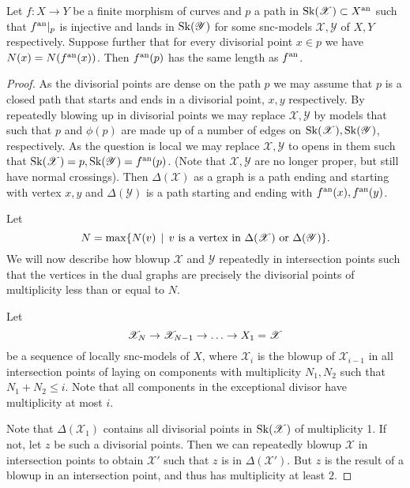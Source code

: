 \begin{lemma}\label{lem:equality_lenghts_preserve_mult}
	Let $f: X \to Y$ be a finite morphism of curves and $p$ a path in $\operatorname{Sk}(\mathscr X)\subset X{}^{\text{an}} $  such that $f{}^{\text{an}}|_p$ is injective and lands in $\operatorname{Sk}(\mathscr Y)$ for some snc-models $\mathscr X, \mathscr Y$ of $X, Y$ respectively. 
	Suppose further that for every divisorial point $x \in p$  we have $N(x) = N(f{}^{\text{an}}(x))$. 
	Then $f{}^{\text{an}}(p)$ has the same length as $f{}^{\text{an}}$. 
\end{lemma}
\begin{proof}
	As the divisorial points are dense on the path $p$ we may assume that $p$ is a closed path that starts and ends in a divisorial point, $x, y$ respectively.
	By repeatedly blowing up in divisorial points we may replace $\mathscr X, \mathscr Y$ by models that such that $p$ and $\phi(p)$ are made up of a number of edges on $\operatorname{Sk}(\mathscr X), \operatorname{Sk}(\mathscr Y)$, respectively. 
	As the question is local we may replace $\mathscr X, \mathscr Y$ to opens in them such that $\operatorname{Sk}(\mathscr X) = p, \operatorname{Sk}(\mathscr Y) = f{}^{\text{an}} (p)$. (Note that $\mathscr X, \mathscr Y$ are no longer proper, but still have normal crossings).  
	Then $\Delta(\mathscr X)$ as a graph is a path ending and starting with vertex $x, y$ and $\Delta(\mathscr Y)$ is a path starting and ending with $f{}^{\text{an}}(x), f{}^{\text{an}}(y)$. 

	Let \[
		N = \max \{N(v) \st v \text{ is a vertex in } \Delta(\mathscr X) \text{ or } \Delta(\mathscr Y)\} 
	.\] 
	We will now describe how blowup $\mathscr X$ and $\mathscr Y$ repeatedly in intersection points such that the vertices in the dual graphs are precisely the divisorial points of multiplicity less than or equal to $N$. 

	Let \[
	\mathscr X_N \to \mathscr X_{N - 1} \to \ldots \to \mathscr \mathscr X_1 = \mathscr X
	\] 
	be a sequence of locally snc-models of  $X$, where $\mathscr X_i$ is the blowup of $\mathscr X_{i-1}$ in all intersection points of laying on components with multiplicity $N_1, N_2$ such that $N_1 + N_2 \le i$. 
	Note that all components in the exceptional divisor have multiplicity at most $i$. 

	Note that $\Delta(\mathscr X_1)$ contains all divisorial points in $\operatorname{Sk}(\mathscr X)$ of multiplicity 1. If not, let $z$ be such a divisorial points. 
	Then we can repeatedly blowup $\mathscr X$ in intersection points to obtain $\mathscr X'$ such that $z$ is in $\Delta(\mathscr X')$. 
	But $z$ is the result of a blowup in an intersection point, and thus has multiplicity at least $2$. 


\end{proof}
